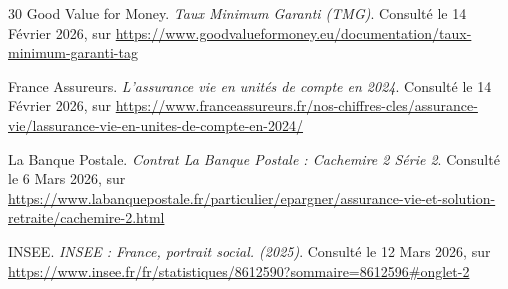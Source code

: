 \begin{thebibliography}{30}
Good Value for Money. \textit{Taux Minimum Garanti (TMG)}. Consulté le 14 Février 2026, sur \url{https://www.goodvalueformoney.eu/documentation/taux-minimum-garanti-tag}

France Assureurs. \textit{L’assurance vie en unités de compte en 2024}. Consulté le 14 Février 2026, sur \url{https://www.franceassureurs.fr/nos-chiffres-cles/assurance-vie/lassurance-vie-en-unites-de-compte-en-2024/}

La Banque Postale. \textit{Contrat La Banque Postale : Cachemire 2 Série 2}. Consulté le 6 Mars 2026, sur \url{https://www.labanquepostale.fr/particulier/epargner/assurance-vie-et-solution-retraite/cachemire-2.html}

INSEE. \textit{INSEE : France, portrait social. (2025)}. Consulté le 12 Mars 2026, sur \url{https://www.insee.fr/fr/statistiques/8612590?sommaire=8612596#onglet-2}

\end{thebibliography}